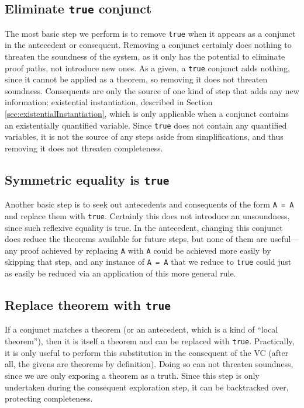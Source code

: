 	\subsection{Eliminate \texttt{true} conjunct\label{sec:eliminateTrue}}
The most basic step we perform is to remove \texttt{true} when it appears as a conjunct in the antecedent or consequent.  Removing a conjunct certainly does nothing to threaten the soundness of the system, as it only has the potential to eliminate proof paths, not introduce new ones.  As a given, a \texttt{true} conjunct adds nothing, since it cannot be applied as a theorem, so removing it does not threaten soundness.  Consequents are only the source of one kind of step that adds any new information: existential instantiation, described in Section \ref{sec:existentialInstantiation}, which is only applicable when a conjunct contains an existentially quantified variable.  Since \texttt{true} does not contain any quantified variables, it is not the source of any steps aside from simplifications, and thus removing it does not threaten completeness.

	\subsection{Symmetric equality is \texttt{true}}
Another basic step is to seek out antecedents and consequents of the form \texttt{A~=~A} and replace them with \texttt{true}.  Certainly this does not introduce an unsoundness, since such reflexive equality is true.  In the antecedent, changing this conjunct does reduce the theorems available for future steps, but none of them are useful---any proof achieved by replacing \texttt{A} with \texttt{A} could be achieved more easily by skipping that step, and any instance of \texttt{A~=~A} that we reduce to \texttt{true} could just as easily be reduced via an application of this more general rule.

	\subsection{Replace theorem with \texttt{true}}
If a conjunct matches a theorem (or an antecedent, which is a kind of ``local theorem''), then it is itself a theorem and can be replaced with \texttt{true}.  Practically, it is only useful to perform this substitution in the consequent of the VC (after all, the givens are theorems by definition).  Doing so can not threaten soundness, since we are only exposing a theorem as a truth.  Since this step is only undertaken during the consequent exploration step, it can be backtracked over, protecting completeness.

